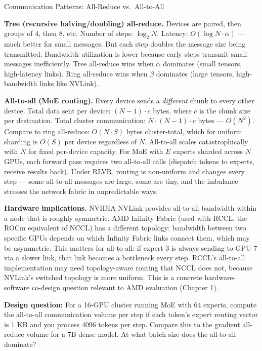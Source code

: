 \begin{thinkfirst}{Communication Patterns: All-Reduce vs.\ All-to-All}
\begin{center}
\end{center}

\medskip
\textbf{Tree (recursive halving/doubling) all-reduce.}
Devices are paired, then groups of 4, then 8, etc.
Number of steps: $\log_2 N$.
Latency: $O(\log N \cdot \alpha)$ --- much better for small messages.
But each step doubles the message size being transmitted.
Bandwidth utilization is lower because early steps transmit small messages inefficiently.
Tree all-reduce wins when $\alpha$ dominates (small tensors, high-latency links).
Ring all-reduce wins when $\beta$ dominates (large tensors, high-bandwidth links like NVLink).

\medskip
\textbf{All-to-all (MoE routing).}
Every device sends a \emph{different} chunk to every other device.
Total data sent per device: $(N-1) \cdot c$ bytes, where $c$ is the chunk size per destination.
Total cluster communication: $N \cdot (N-1) \cdot c$ bytes --- $O(N^2)$.
Compare to ring all-reduce: $O(N \cdot S)$ bytes cluster-total, which for uniform sharding is
$O(S)$ per device regardless of $N$.
All-to-all scales catastrophically with $N$ for fixed per-device capacity.
For MoE with $E$ experts sharded across $N$ GPUs, each forward pass requires two all-to-all calls
(dispatch tokens to experts, receive results back).
Under RLVR, routing is non-uniform and changes every step --- some all-to-all messages are large,
some are tiny, and the imbalance stresses the network fabric in unpredictable ways.

\medskip
\textbf{Hardware implications.}
NVIDIA NVLink provides all-to-all bandwidth within a node that is roughly symmetric.
AMD Infinity Fabric (used with RCCL, the ROCm equivalent of NCCL) has a different topology:
bandwidth between two specific GPUs depends on which Infinity Fabric links connect them,
which may be asymmetric.
This matters for all-to-all: if expert 3 is always sending to GPU 7 via a slower link,
that link becomes a bottleneck every step.
RCCL's all-to-all implementation may need topology-aware routing that NCCL does not,
because NVLink's switched topology is more uniform.
This is a concrete hardware-software co-design question relevant to AMD evaluation (Chapter 1).

\medskip
\textbf{Design question:} For a 16-GPU cluster running MoE with 64 experts, compute the all-to-all
communication volume per step if each token's expert routing vector is 1 KB and you process 4096
tokens per step.
Compare this to the gradient all-reduce volume for a 7B dense model.
At what batch size does the all-to-all dominate?
\end{thinkfirst}

